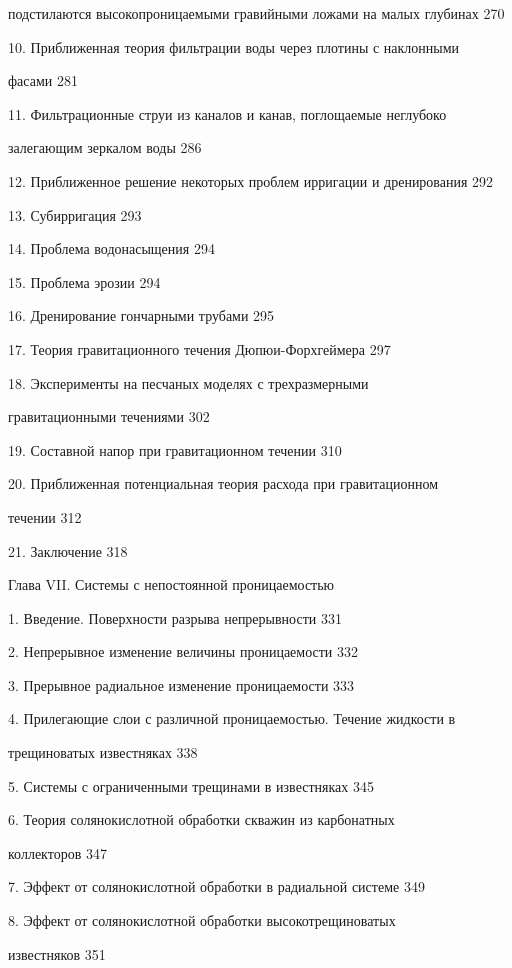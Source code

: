 \documentclass[
  11pt,
]{article}
\begin{document}
подстилаются высокопроницаемыми гравийными ложами на малых глубинах 270 \par
10. Приближенная теория фильтрации воды через плотины с наклонными \par
фасами 281 \par
11. Фильтрационные струи из каналов и канав, поглощаемые неглубоко  \par
залегающим зеркалом воды 286 \par
12. Приближенное решение некоторых проблем ирригации и дренирования 292 \par
13. Субирригация 293 \par
14. Проблема водонасыщения 294 \par
15. Проблема эрозии 294 \par
16. Дренирование гончарными трубами 295 \par
17. Теория гравитационного течения Дюпюи-Форхгеймера 297 \par
18. Эксперименты на песчаных моделях с трехразмерными  \par
гравитационными течениями 302 \par
19. Составной напор при гравитационном течении 310 \par
20. Приближенная потенциальная теория расхода при гравитационном  \par
течении 312 \par
21. Заключение 318 \par
Глава VII. Системы с непостоянной проницаемостью \par
1. Введение. Поверхности разрыва непрерывности 331 \par
2. Непрерывное изменение величины проницаемости 332 \par
3. Прерывное радиальное изменение проницаемости 333 \par
4. Прилегающие слои с различной проницаемостью. Течение жидкости в \par
трещиноватых известняках 338 \par
5. Системы с ограниченными трещинами в известняках 345 \par
6. Теория солянокислотной обработки скважин из карбонатных  \par
коллекторов 347 \par
7. Эффект от солянокислотной обработки в радиальной системе 349 \par
8. Эффект от солянокислотной обработки высокотрещиноватых  \par
известняков 351 \par
\end{document}
